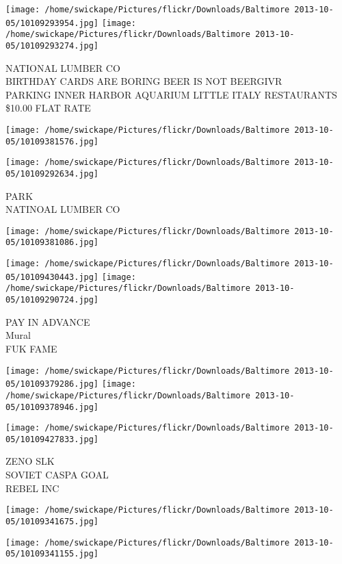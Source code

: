 \documentclass[10pt,letterpaper]{article}
\begin{document}
\vspace{0.25in}
\texttt{[image: /home/swickape/Pictures/flickr/Downloads/Baltimore 2013-10-05/10109293954.jpg]}
\texttt{[image: /home/swickape/Pictures/flickr/Downloads/Baltimore 2013-10-05/10109293274.jpg]}

NATIONAL LUMBER CO\\
BIRTHDAY CARDS ARE BORING BEER IS NOT BEERGIVR\\
PARKING INNER HARBOR AQUARIUM LITTLE ITALY RESTAURANTS \$10.00 FLAT RATE
\pagebreak

\texttt{[image: /home/swickape/Pictures/flickr/Downloads/Baltimore 2013-10-05/10109381576.jpg]}

\vspace{0.25in}
\texttt{[image: /home/swickape/Pictures/flickr/Downloads/Baltimore 2013-10-05/10109292634.jpg]}

PARK\\
NATINOAL LUMBER CO
\pagebreak

\texttt{[image: /home/swickape/Pictures/flickr/Downloads/Baltimore 2013-10-05/10109381086.jpg]}

\vspace{0.25in}
\texttt{[image: /home/swickape/Pictures/flickr/Downloads/Baltimore 2013-10-05/10109430443.jpg]}
\texttt{[image: /home/swickape/Pictures/flickr/Downloads/Baltimore 2013-10-05/10109290724.jpg]}

PAY IN ADVANCE\\
Mural\\
FUK FAME
\pagebreak

\texttt{[image: /home/swickape/Pictures/flickr/Downloads/Baltimore 2013-10-05/10109379286.jpg]}
\texttt{[image: /home/swickape/Pictures/flickr/Downloads/Baltimore 2013-10-05/10109378946.jpg]}

\vspace{0.25in}
\texttt{[image: /home/swickape/Pictures/flickr/Downloads/Baltimore 2013-10-05/10109427833.jpg]}

ZENO SLK\\
SOVIET CASPA GOAL\\
REBEL INC
\pagebreak

\texttt{[image: /home/swickape/Pictures/flickr/Downloads/Baltimore 2013-10-05/10109341675.jpg]}

\vspace{0.25in}
\texttt{[image: /home/swickape/Pictures/flickr/Downloads/Baltimore 2013-10-05/10109341155.jpg]}
\end{document}

